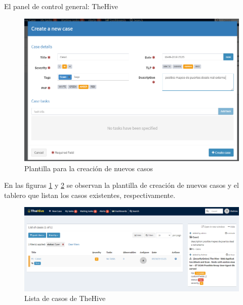 \begin{section}{El panel de control general: TheHive }
        \begin{figure}[H]
        \centering
        \includegraphics[width=1\textwidth]{./descripcion_sonion_imagenes/figura_24_plantilla_creacion_casos.png}
        \caption{Plantilla para la creación de nuevos casos}
        \label{fig:figura_24_plantilla_nuevos_casos}
     \end{figure}
     \FloatBarrier
     En las figuras \ref{fig:figura_24_plantilla_nuevos_casos} y \ref{fig:dashboard_dinamico} se observan la plantilla de creación de nuevos casos y el tablero que listan los casos existentes, respectivamente.
     \begin{figure}[H]
        \centering
        \includegraphics[width=1\textwidth]{./descripcion_sonion_imagenes/figura_25_dashboard_dinamico_thehive.png}
        \caption{Lista de casos de TheHive}
        \label{fig:dashboard_dinamico}
     \end{figure}
     \FloatBarrier

\end{section}
